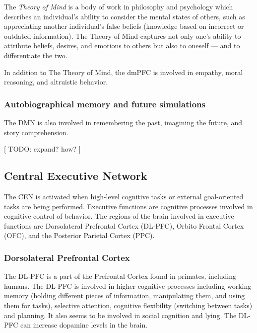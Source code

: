 \documentclass[twocolumn]{article}
\begin{document}
The \textit{Theory of Mind} is a body of work in philosophy and psychology which
describes an individual's ability to consider the mental states of others, such as
appreciating another individual's false beliefs (knowledge based on incorrect or
outdated information). The Theory of Mind captures not only one's ability to
attribute beliefs, desires, and emotions to others but also to oneself --- and to
differentiate the two. \cite{autistictheoryofmind}

In addition to The Theory of Mind, the dmPFC is involved in empathy, moral reasoning,
and altruistic behavior. \cite{defaultnetworkadaptive,dmpfcothers,dmpfcaltruism}

\subsubsection{Autobiographical memory and future simulations}

The DMN is also involved in remembering the past, imagining the future, and story
comprehension. \cite{defaultnetworkadaptive}

[ TODO: expand? how? ]


\subsection{Central Executive Network}

The CEN is activated when high-level cognitive tasks or external goal-oriented tasks
are being performed. Executive functions are cognitive processes involved in
cognitive control of behavior. The regions of the brain involved in executive
functions are Dorsolateral Prefrontal Cortex (DL-PFC), Orbito Frontal Cortex (OFC),
and the Posterior Parietal Cortex (PPC).

\subsubsection{Dorsolateral Prefrontal Cortex}

The DL-PFC is a part of the Prefrontal Cortex found in primates, including
humans. The DL-PFC is involved in higher cognitive processes including working memory
(holding different pieces of information, manipulating them, and using them for
tasks), selective attention, cognitive flexibility (switching between tasks) and
planning. It also seems to be involved in social cognition and lying. The DL-PFC can
increase dopamine levels in the brain. \cite{dlpfcmemory,dlpfctasks,dlpfclying}
\end{document}
